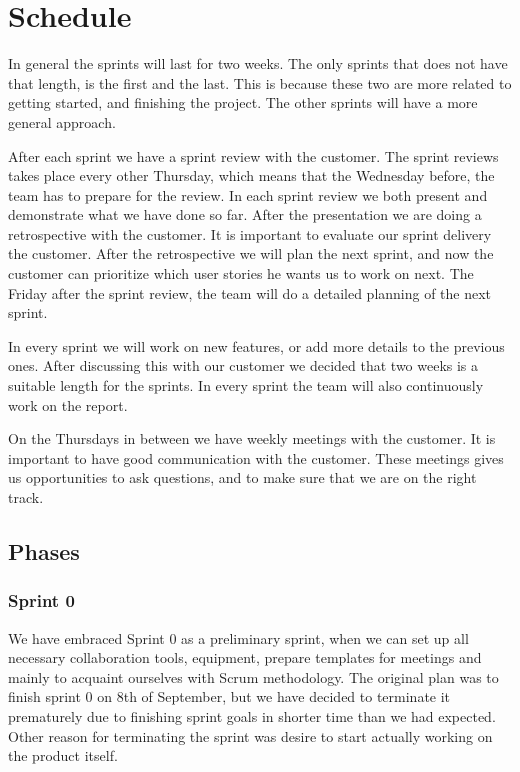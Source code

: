 \documentclass{article}
\begin{document}
\section{Schedule}

In general the sprints will last for two weeks. The only sprints that does not have that length, is the first and the last. This is because these two are more related to getting started, and finishing the project. The other sprints will have a more general approach. 

After each sprint we have a sprint review with the customer. The sprint reviews takes place every other Thursday, which means that the Wednesday before, the team has to prepare for the review. In each sprint review we both present and demonstrate what we have done so far. After the presentation we are doing a retrospective with the customer. It is important to evaluate our sprint delivery the customer. After the retrospective we will plan the next sprint, and now the customer can prioritize which user stories he wants us to work on next. The Friday after the sprint review, the team will do a detailed planning of the next sprint.

In every sprint we will work on new features, or add more details to the previous ones. After discussing this with our customer we decided that two weeks is a suitable length for the sprints. In every sprint the team will also continuously work on the report.  

On the Thursdays in between we have weekly meetings with the customer. It is important to have good communication with the customer. These meetings gives us opportunities to ask questions, and to make sure that we are on the right track.

\subsection{Phases}
\subsubsection{Sprint 0}
We have embraced Sprint 0 as a preliminary sprint, when we can set up all necessary collaboration tools, equipment, prepare templates for meetings and mainly to acquaint ourselves with Scrum methodology. The original plan was to finish sprint 0 on 8th of September, but we have decided to terminate it prematurely due to finishing sprint goals in shorter time than we had expected. Other reason for terminating the sprint was desire to start actually working on the product itself.
\end{document}
